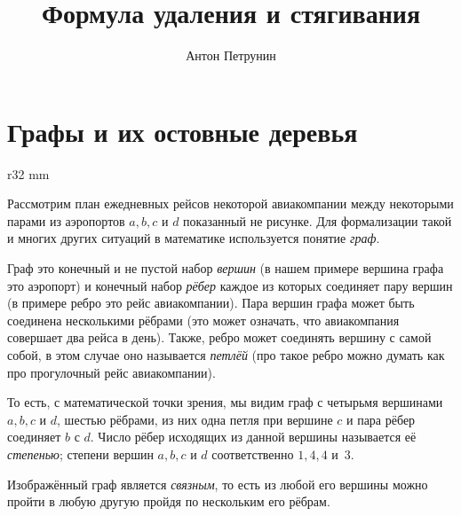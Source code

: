\documentclass{article}
\begin{document}
\title{Формула удаления и стягивания}
\author{Антон Петрунин}
\date{}
\maketitle


\section{Графы и их остовные деревья}

\begin{wrapfigure}{r}{32 mm}
\end{wrapfigure}

Рассмотрим план ежедневных рейсов некоторой авиакомпании между некоторыми парами из аэропортов $a,b,c$ и $d$
показанный не рисунке.
Для формализации такой и многих других ситуаций в математике используется понятие \emph{граф}.

Граф это конечный и не пустой набор \emph{вершин} (в нашем примере вершина графа это аэропорт) 
и конечный набор \emph{рёбер} каждое из которых соединяет пару вершин (в примере ребро это рейс авиакомпании).
Пара вершин графа может быть соединена несколькими рёбрами (это может означать, что авиакомпания совершает два рейса в день). 
Также, ребро может соединять вершину с самой собой, в этом случае оно называется \emph{петлёй} (про такое ребро можно думать как про прогулочный рейс авиакомпании).

То есть, с математической точки зрения, мы видим граф с четырьмя вершинами $a,b,c$ и $d$, 
шестью рёбрами, из них
одна петля при вершине $c$ и пара рёбер соединяет $b$ с $d$.
Число рёбер исходящих из данной вершины называется её \emph{степенью};
степени вершин $a,b,c$ и $d$ соответственно $1,4,4$ и~$3$.


Изображённый граф является \emph{связным}, то есть из любой его вершины можно пройти в любую другую пройдя по нескольким его рёбрам.
\end{document}
